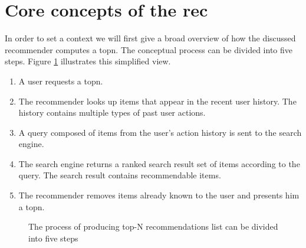 \section{Core concepts of the \gls{rec}}
\label{sec:design}

In order to set a context we will first give a broad overview of how the discussed recommender computes a \gls{topn}.
The conceptual process can be divided into five steps. Figure \ref{fig:topndataflow} illustrates this simplified view.

\begin{enumerate}
\item A user requests a \gls{topn}.
\item The recommender looks up items that appear in the recent user history. The history contains multiple types of past user actions.
\item A query composed of items from the user's action history is sent to the search engine.
\item The search engine returns a ranked search result set of items according to the query. The search result contains recommendable items.
\item The recommender removes items already known to the user and presents him a \gls{topn}.
\end{enumerate}


\begin{figure}
  \centering
  \caption{The process of producing top-N recommendations list can be divided into five steps}
  \label{fig:topndataflow}
\end{figure}

